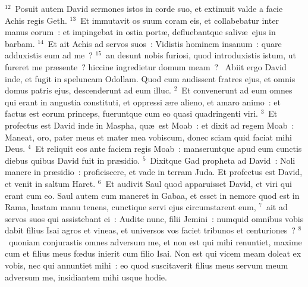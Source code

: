 ${}^{12}$~Posuit autem David sermones istos in corde suo, et extimuit valde a facie Achis regis Geth.
${}^{13}$~Et immutavit os suum coram eis, et collabebatur inter manus eorum~: et impingebat in ostia port\ae , defluebantque saliv\ae\ ejus in barbam.
${}^{14}$~Et ait Achis ad servos suos~: Vidistis hominem insanum~: quare adduxistis eum ad me~?
${}^{15}$~an desunt nobis furiosi, quod introduxistis istum, ut fureret me pr\ae sente~? hiccine ingredietur domum meam~?
~\lettrine[lines=10,image=true,loversize=0.05,lraise=-0.03]{A}{}biit ergo David inde, et fugit in speluncam Odollam. Quod cum audissent fratres ejus, et omnis domus patris ejus, descenderunt ad eum illuc.
${}^{2}$~Et convenerunt ad eum omnes qui erant in angustia constituti, et oppressi \ae re alieno, et amaro animo~: et factus est eorum princeps, fueruntque cum eo quasi quadringenti viri.
${}^{3}$~Et profectus est David inde in Maspha, qu\ae\ est Moab~: et dixit ad regem Moab~: Maneat, oro, pater meus et mater mea vobiscum, donec sciam quid faciat mihi Deus.
${}^{4}$~Et reliquit eos ante faciem regis Moab~: manseruntque apud eum cunctis diebus quibus David fuit in pr\ae sidio.
${}^{5}$~Dixitque Gad propheta ad David~: Noli manere in pr\ae sidio~: proficiscere, et vade in terram Juda. Et profectus est David, et venit in saltum Haret.
${}^{6}$~Et audivit Saul quod apparuisset David, et viri qui erant cum eo. Saul autem cum maneret in Gabaa, et esset in nemore quod est in Rama, hastam manu tenens, cunctique servi ejus circumstarent eum,
${}^{7}$~ait ad servos suos qui assistebant ei~: Audite nunc, filii Jemini~: numquid omnibus vobis dabit filius Isai agros et vineas, et universos vos faciet tribunos et centuriones~?
${}^{8}$~quoniam conjurastis omnes adversum me, et non est qui mihi renuntiet, maxime cum et filius meus fœdus inierit cum filio Isai. Non est qui vicem meam doleat ex vobis, nec qui annuntiet mihi~: eo quod suscitaverit filius meus servum meum adversum me, insidiantem mihi usque hodie.


